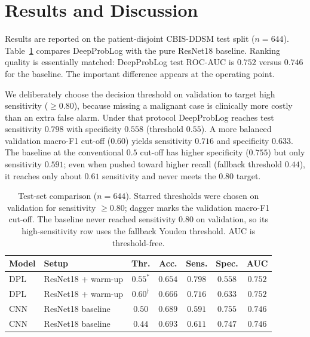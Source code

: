 \section{Results and Discussion}
\label{sec:results}

Results are reported on the patient-disjoint CBIS-DDSM test split ($n=644$). Table~\ref{tab:comparison} compares DeepProbLog with the pure ResNet18 baseline. Ranking quality is essentially matched: DeepProbLog test ROC-AUC is $0.752$ versus $0.746$ for the baseline. The important difference appears at the operating point.

We deliberately choose the decision threshold on validation to target high sensitivity ($\geq 0.80$), because missing a malignant case is clinically more costly than an extra false alarm. Under that protocol DeepProbLog reaches test sensitivity $0.798$ with specificity $0.558$ (threshold $0.55$). A more balanced validation macro-F1 cut-off ($0.60$) yields sensitivity $0.716$ and specificity $0.633$. The baseline at the conventional $0.5$ cut-off has higher specificity ($0.755$) but only sensitivity $0.591$; even when pushed toward higher recall (fallback threshold $0.44$), it reaches only about $0.61$ sensitivity and never meets the $0.80$ target.

\begin{table}[!t]
\caption{Test-set comparison ($n=644$). Starred thresholds were chosen on validation for sensitivity $\geq 0.80$; dagger marks the validation macro-F1 cut-off. The baseline never reached sensitivity $0.80$ on validation, so its high-sensitivity row uses the fallback Youden threshold. AUC is threshold-free.}
\label{tab:comparison}
\centering
\small
\begin{tabular}{@{}llccccc@{}}
\toprule
Model & Setup & Thr. & Acc. & Sens. & Spec. & AUC \\
\midrule
DPL & ResNet18 + warm-up & $0.55^*$ & $0.654$ & $0.798$ & $0.558$ & $0.752$ \\
DPL & ResNet18 + warm-up & $0.60^\dagger$ & $0.666$ & $0.716$ & $0.633$ & $0.752$ \\
CNN & ResNet18 baseline & $0.50$ & $0.689$ & $0.591$ & $0.755$ & $0.746$ \\
CNN & ResNet18 baseline & $0.44$ & $0.693$ & $0.611$ & $0.747$ & $0.746$ \\
\bottomrule
\end{tabular}
\end{table}

